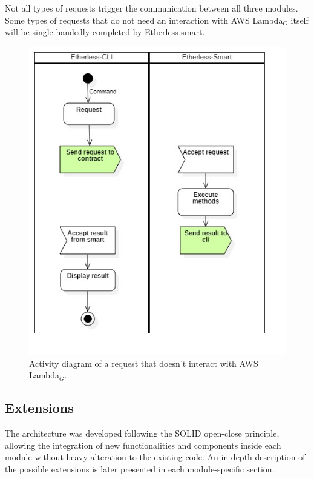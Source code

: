 	Not all types of requests trigger the communication between all three modules. Some types of requests that do not need an interaction with AWS Lambda$_{G}$ itself will be single-handedly completed by Etherless-smart.
	\begin{figure} [h!]
		\centering
		\includegraphics[width=0.8\linewidth]{diagrammi/generali/activity_diag_pattern1}
		\caption{Activity diagram of a request that doesn't interact with AWS Lambda$_{G}$.}
	\end{figure}
	\pagebreak
	\subsection{Extensions} %
	The architecture was developed following the SOLID open-close principle, allowing the integration of new functionalities and components inside each module without heavy alteration to the existing code. An in-depth description of the possible extensions is later presented in each module-specific section.
